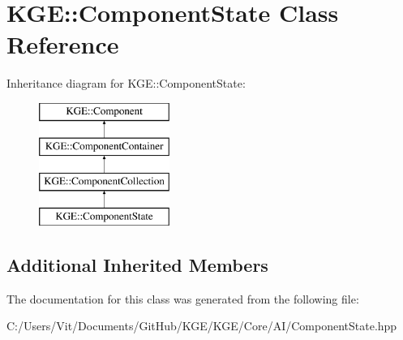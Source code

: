 \hypertarget{class_k_g_e_1_1_component_state}{\section{K\-G\-E\-:\-:Component\-State Class Reference}
\label{class_k_g_e_1_1_component_state}
}
Inheritance diagram for K\-G\-E\-:\-:Component\-State\-:\begin{figure}[H]
\begin{center}
\leavevmode
\includegraphics[height=4.000000cm]{class_k_g_e_1_1_component_state}
\end{center}
\end{figure}
\subsection*{Additional Inherited Members}


The documentation for this class was generated from the following file\-:\begin{DoxyCompactItemize}
\item 
C\-:/\-Users/\-Vit/\-Documents/\-Git\-Hub/\-K\-G\-E/\-K\-G\-E/\-Core/\-A\-I/Component\-State.\-hpp\end{DoxyCompactItemize}
